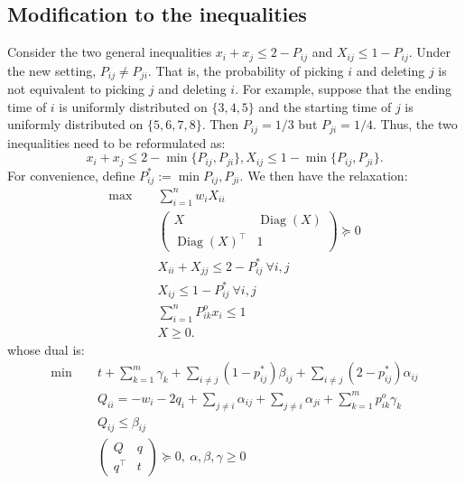 \documentclass{article}
\newcommand{\Diag}{\operatorname{Diag}}
\begin{document}
\subsection{Modification to the inequalities}
Consider the two general inequalities $x_i+x_j\leq 2-P_{ij}$ and $X_{ij}\leq 1-P_{ij}$.
Under the new setting, $P_{ij}\neq P_{ji}$.
That is, the probability of picking $i$ and deleting $j$ is not equivalent to picking $j$ and deleting $i$.
For example, suppose that the ending time of $i$ is uniformly distributed on $\{3,4,5\}$ and the starting time of $j$ is uniformly distributed on $\{5,6,7,8\}$.
Then $P_{ij}= 1/3$ but $P_{ji}= 1/4$. 
Thus, the two inequalities need to be reformulated as:
\[x_i+x_j\leq 2-\min\{P_{ij},P_{ji}\}, X_{ij}\leq 1- \min\{P_{ij},P_{ji}\}.\]
For convenience, define $P^*_{ij} := \min{P_{ij},P_{ji}}$.
We then have the relaxation:
\begin{align*}
    \max\quad~&\sum_{i=1}^{n}w_iX_{ii}\\
    &\begin{pmatrix}
        X &\Diag(X)\\
        \Diag(X)^\top &1
    \end{pmatrix}\succeq 0\\
    &X_{ii}+X_{jj}\leq 2-P^*_{ij}~\forall i,j\\
    &X_{ij}\leq 1-P^*_{ij}~\forall i,j\\
    & \sum_{i=1}^{n}P_{ik}^o x_i\leq1\\
    &X\geq 0.
\end{align*}
whose dual is:
\begin{align*}
    \min\quad~&t+\sum_{k=1}^{m}\gamma_k+\sum_{i\neq j}(1-p^*_{ij})\beta_{ij}+\sum_{i\neq j}(2-p^*_{ij})\alpha_{ij}\\
    &Q_{ii} = -w_i - 2q_i + \sum_{j\neq i}\alpha_{ij}+\sum_{j\neq i}\alpha_{ji}+\sum_{k=1}^{m}p_{ik}^{o}\gamma_k \\
    &Q_{ij}\leq \beta_{ij}\\
    &\begin{pmatrix}
        Q&q\\
        q^\top&t
    \end{pmatrix}\succeq 0,~\alpha,\beta,\gamma\geq 0
\end{align*}
\end{document}
